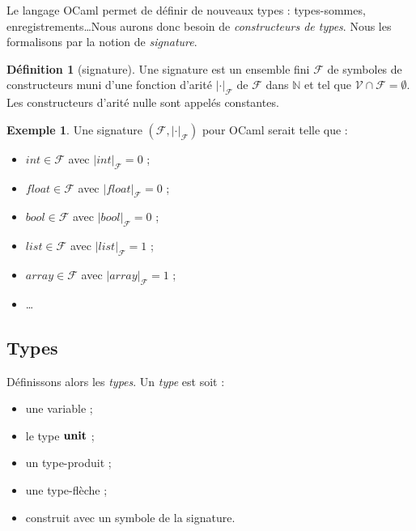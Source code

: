 \documentclass[a4paper]{report}
\theoremstyle{definition}
\newtheorem{definition}[theoreme]{Définition}
\newtheorem{exemple}[theoreme]{Exemple}
\newcommand{\unit}{\bold{unit}}
\newcommand{\V}{\mathscr{V}}
\newcommand{\F}{\mathscr{F}}
\begin{document}
Le langage OCaml permet de définir de nouveaux types : types-sommes, enregistrements\ldots Nous aurons donc besoin de \emph{constructeurs de types}. Nous les formalisons par la notion de \emph{signature}.

\begin{definition}[signature]
  Une signature est un ensemble fini $\F$ de symboles de constructeurs muni d'une fonction d'arité $| \cdot |_\F$ de $\F$ dans $\mathbb{N}$ et tel que $\V \cap \F = \emptyset$. Les constructeurs d'arité nulle sont appelés constantes.
\end{definition}

\begin{exemple}
  Une signature $( \F, | \cdot |_\F )$ pour OCaml serait telle que :
  \begin{itemize}
    \item $int \in \F$ avec $| int |_\F = 0$ ;
    \item $float \in \F$ avec $| float |_\F = 0$ ;
    \item $bool \in \F$ avec $| bool |_\F = 0$ ;
    \item $list \in \F$ avec $| list |_\F = 1$ ;
    \item $array \in \F$ avec $| array |_\F = 1$ ;
    \item \dots
  \end{itemize}
\end{exemple}



\subsection{Types}

Définissons alors les \emph{types}. Un \emph{type} est soit :
\begin{itemize}[nosep]
  \item une variable ; 
  \item le type $\unit$ ;
  \item un type-produit ;
  \item une type-flèche ;
  \item construit avec un symbole de la signature.
\end{itemize}
\end{document}
